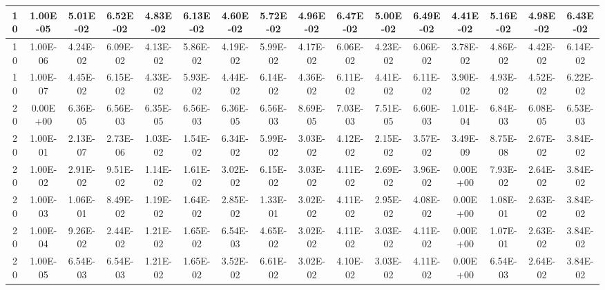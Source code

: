 \begin{table}[H]
\begin{center}
{\begin{tabular}{|c|c|c|c|c|c|c|c|c|c|c|c|c|c|c|c|}
10    &    1.00E-05    &    5.01E-02    &    6.52E-02    &    4.83E-02    &    6.13E-02    &    4.60E-02    &    5.72E-02    &    4.96E-02    &    6.47E-02    &    5.00E-02    &    6.49E-02    &    4.41E-02    &    5.16E-02    &    4.98E-02    &    6.43E-02    \\ \hline
10    &    1.00E-06    &    4.24E-02    &    6.09E-02    &    4.13E-02    &    5.86E-02    &    4.19E-02    &    5.99E-02    &    4.17E-02    &    6.06E-02    &    4.23E-02    &    6.06E-02    &    3.78E-02    &    4.86E-02    &    4.42E-02    &    6.14E-02    \\ \hline
10    &    1.00E-07    &    4.45E-02    &    6.15E-02    &    4.33E-02    &    5.93E-02    &    4.44E-02    &    6.14E-02    &    4.36E-02    &    6.11E-02    &    4.41E-02    &    6.11E-02    &    3.90E-02    &    4.93E-02    &    4.52E-02    &    6.22E-02    \\ \hline
20    &    0.00E+00    &    6.36E-05    &    6.56E-03    &    6.35E-05    &    6.56E-03    &    6.36E-05    &    6.56E-03    &    8.69E-05    &    7.03E-03    &    7.51E-05    &    6.60E-03    &    1.01E-04    &    6.84E-03    &    6.08E-05    &    6.53E-03    \\ \hline
20    &    1.00E-01    &    2.13E-07    &    2.73E-06    &    1.03E-02    &    1.54E-02    &    6.34E-02    &    5.99E-02    &    3.03E-02    &    4.12E-02    &    2.15E-02    &    3.57E-02    &    3.49E-09    &    8.75E-08    &    2.67E-02    &    3.84E-02    \\ \hline
20    &    1.00E-02    &    2.91E-02    &    9.51E-02    &    1.14E-02    &    1.61E-02    &    3.02E-02    &    6.15E-02    &    3.03E-02    &    4.11E-02    &    2.69E-02    &    3.96E-02    &    0.00E+00    &    7.93E-02    &    2.64E-02    &    3.84E-02    \\ \hline
20    &    1.00E-03    &    1.06E-01    &    8.49E-02    &    1.19E-02    &    1.64E-02    &    2.85E-02    &    1.33E-01    &    3.02E-02    &    4.11E-02    &    2.95E-02    &    4.08E-02    &    0.00E+00    &    1.08E-01    &    2.63E-02    &    3.84E-02    \\ \hline
20    &    1.00E-04    &    9.26E-02    &    2.44E-02    &    1.21E-02    &    1.65E-02    &    6.54E-03    &    4.65E-02    &    3.02E-02    &    4.11E-02    &    3.03E-02    &    4.11E-02    &    0.00E+00    &    1.07E-01    &    2.63E-02    &    3.84E-02    \\ \hline
20    &    1.00E-05    &    6.54E-03    &    6.54E-03    &    1.21E-02    &    1.65E-02    &    3.52E-02    &    6.61E-02    &    3.02E-02    &    4.10E-02    &    3.03E-02    &    4.11E-02    &    0.00E+00    &    6.54E-03    &    2.64E-02    &    3.84E-02    \\ \hline

\end{tabular}}
\end{center}
\end{table}
